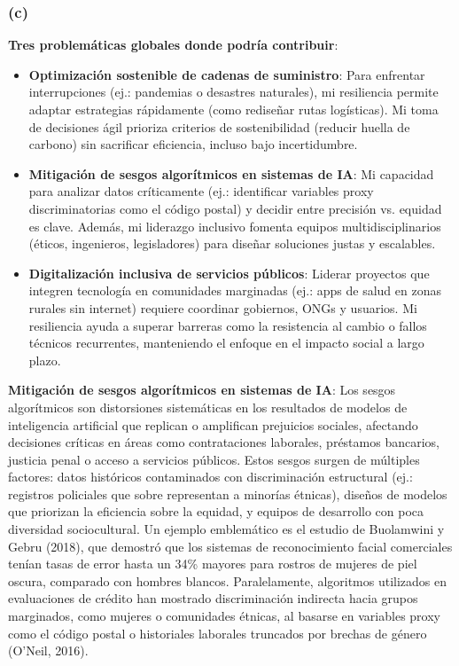 \documentclass[12pt]{article}
\begin{document}
\subsubsection*{(c)}

\textbf{Tres problemáticas globales donde podría contribuir}:
\begin{itemize}
    \item \textbf{Optimización sostenible de cadenas de suministro}: Para enfrentar interrupciones (ej.: pandemias o desastres naturales), mi resiliencia permite adaptar estrategias rápidamente (como rediseñar rutas logísticas). Mi toma de decisiones ágil prioriza criterios de sostenibilidad (reducir huella de carbono) sin sacrificar eficiencia, incluso bajo incertidumbre.
    \item \textbf{Mitigación de sesgos algorítmicos en sistemas de IA}: Mi capacidad para analizar datos críticamente (ej.: identificar variables proxy discriminatorias como el código postal) y decidir entre precisión vs. equidad es clave. Además, mi liderazgo inclusivo fomenta equipos multidisciplinarios (éticos, ingenieros, legisladores) para diseñar soluciones justas y escalables.
    \item \textbf{Digitalización inclusiva de servicios públicos}: Liderar proyectos que integren tecnología en comunidades marginadas (ej.: apps de salud en zonas rurales sin internet) requiere coordinar gobiernos, ONGs y usuarios. Mi resiliencia ayuda a superar barreras como la resistencia al cambio o fallos técnicos recurrentes, manteniendo el enfoque en el impacto social a largo plazo.
\end{itemize}

\textbf{Mitigación de sesgos algorítmicos en sistemas de IA}: Los sesgos algorítmicos son distorsiones sistemáticas en los resultados de modelos de inteligencia artificial que replican o amplifican prejuicios sociales, afectando decisiones críticas en áreas como contrataciones laborales, préstamos bancarios, justicia penal o acceso a servicios públicos. Estos sesgos surgen de múltiples factores: datos históricos contaminados con discriminación estructural (ej.: registros policiales que sobre representan a minorías étnicas), diseños de modelos que priorizan la eficiencia sobre la equidad, y equipos de desarrollo con poca diversidad sociocultural. Un ejemplo emblemático es el estudio de Buolamwini y Gebru (2018), que demostró que los sistemas de reconocimiento facial comerciales tenían tasas de error hasta un 34\% mayores para rostros de mujeres de piel oscura, comparado con hombres blancos. Paralelamente, algoritmos utilizados en evaluaciones de crédito han mostrado discriminación indirecta hacia grupos marginados, como mujeres o comunidades étnicas, al basarse en variables proxy como el código postal o historiales laborales truncados por brechas de género (O’Neil, 2016).
\end{document}
